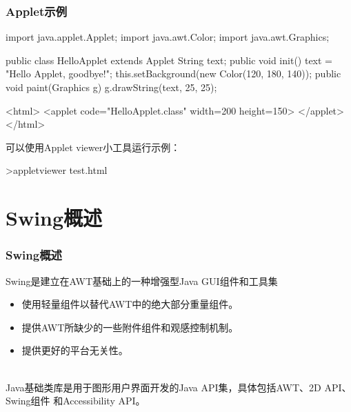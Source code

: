 \begin{frame}[fragile] 
  \frametitle{Applet示例}

  
  \begin{javaCode}
    import java.applet.Applet;
    import java.awt.Color;
    import java.awt.Graphics;

    public class HelloApplet extends Applet {
      String text;
      public void init() {
        text = "Hello Applet, goodbye!";
        this.setBackground(new Color(120, 180, 140));
      }
      public void paint(Graphics g) {
        g.drawString(text, 25, 25);
      }
    }
  \end{javaCode}

  
  \begin{shCode}
    <html>
    <applet code="HelloApplet.class" width=200 height=150> </applet>
    </html>  
  \end{shCode}

  可以使用Applet viewer小工具运行示例：
  
  \begin{shCode}
    >appletviewer test.html
  \end{shCode}
\end{frame}

\section{Swing概述}

\begin{frame}[fragile] %
  \frametitle{Swing概述}


  Swing是建立在AWT基础上的一种增强型Java GUI组件和工具集
  \begin{itemize}\kai
  \item 使用轻量组件以替代AWT中的绝大部分重量组件。
  \item 提供AWT所缺少的一些附件组件和观感控制机制。
  \item 提供更好的平台无关性。
  \end{itemize}

  \\
  Java基础类库是用于图形用户界面开发的Java API集，具体包括AWT、2D API、Swing组件
  和Accessibility API。
\end{frame}

